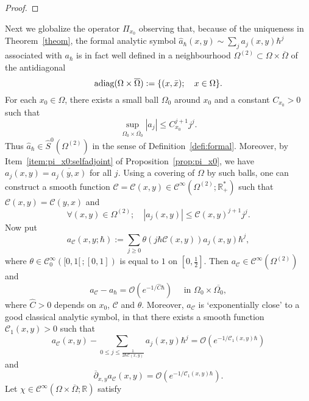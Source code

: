 \documentclass{article}
\newcommand{\abs}[1]{\left|#1\right|}
\newcommand{\dbar}{\overline\partial}
\newcommand{\Cinf}{\mathscr{C}^\infty}
\newcommand{\adiag}{\textup{adiag}}
\newcommand{\RM}{\mathbb{R}}
\renewcommand{\O}{\mathcal{O}}
\newcommand{\h}{\hbar}
\begin{document}
\begin{proof}
 
\end{proof}

Next we globalize the operator $\Pi_{x_0}$ observing that, because of
the uniqueness in Theorem~\ref{theom}, the formal analytic symbol
$\hat a_\h(x,y)\sim\sum_j a_j(x,y) \h^j$ associated with $a_\h$ is in
fact well defined in a neighbourhood
$\Omega^{(2)}\subset \Omega\times\overline{\Omega}$ of the
antidiagonal
\[
\adiag(\Omega\times\overline{\Omega}) := \{(x, \bar x); \quad
x\in\Omega\}.
\]
For each $x_0\in\Omega$, there exists a small ball $\Omega_0$ around
$x_0$ and a constant $C_{x_0}>0$ such that
\begin{equation}
  \sup_{\Omega_0\times\overline{\Omega_0}} \abs{a_j} \leq C_{x_0}^{j+1}j^j.
\end{equation}
Thus $\hat a_\h\in\hat S^0(\Omega^{(2)})$ in the sense of
Definition~\ref{defi:formal}. Moreover, by
Item~\ref{item:pi_x0:selfadjoint} of Proposition~\ref{prop:pi_x0}, we
have $a_j(x,y) = \overline{a_j(y,x)}$ for all $j$. Using a covering of
$\Omega$ by such balls, one can construct a smooth function
$\mathcal{C}=\mathcal{C}(x,y)\in\Cinf(\Omega^{(2)}; \RM^*_+)$ such
that $\mathcal{C}(x,y) = \mathcal{C}(y,x)$ and
\begin{equation}
  \label{equ:C(x,y)}
  \forall (x,y)\in\Omega^{(2)}; \quad \abs{a_j(x,y)} \leq
  \mathcal{C}(x,y)^{j+1}j^j.
\end{equation}
Now put
\[
a_\mathcal{C}(x,y;\h):= \sum_{j\geq 0} \theta(j \h
\mathcal{C}(x,y))a_j(x,y)\h^j,
\]
where $\theta\in\Cinf_0([0,1[\,; [0,1])$ is equal to $1$ on
$[0,\frac{1}{2}]$. Then $a_\mathcal{C}\in\Cinf(\Omega^{(2)})$ and
\begin{equation}
  \label{equ:ac-a}
  a_\mathcal{C} - a_\h = \O(e^{-1/\hat C\h}) \quad \text{ in }
  \Omega_0\times\overline{\Omega_0},
\end{equation}
where $\hat C>0$ depends on $x_0$, $\mathcal{C}$ and
$\theta$. Moreover, $a_\mathcal{C}$ is `exponentially close' to a good
classical analytic symbol, in that there exists a smooth function
$\mathcal{C}_1(x,y)>0$ such that
\begin{equation}
  a_\mathcal{C}(x,y)  - \sum_{0\leq j \leq \frac{1}{2\h \mathcal{C}(x,y)}} a_j(x,y)\h^j = \O(e^{{-1}/{\mathcal{C}_1(x,y)\h}})
\end{equation}
and
\begin{equation}
  \label{equ:dbar-a_C}
  \dbar_{x,y} a_\mathcal{C}(x,y) = \O(e^{{-1}/{\mathcal{C}_1(x,y)\h}}).
\end{equation}
Let $\chi\in\Cinf(\Omega\times\overline{\Omega}; \RM)$ satisfy
\end{document}
